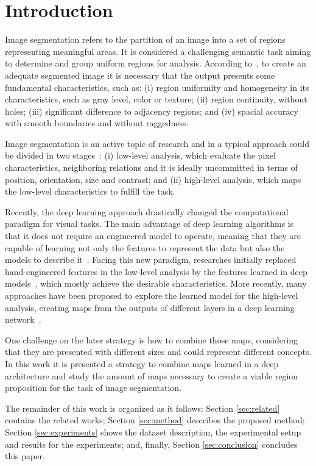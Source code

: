 \section{Introduction}
\label{sec:intro}

Image segmentation refers to the partition of an image into a set of regions representing  meaningful areas. It is considered a challenging semantic task aiming to determine and group uniform regions for analysis. According to~\cite{DOMINGUEZ}, to create an adequate segmented image it is necessary that the output presents some fundamental characteristics, such as: (i) region uniformity and homogeneity in  its characteristics, such as gray level, color or texture; (ii) region continuity, without holes; (iii) significant difference to adjacency regions; and (iv) spacial accuracy with smooth boundaries and without raggedness. 

Image segmentation is an active topic of research and in a typical approach could be divided in two stages~\cite{guigues06}: (i) low-level analysis, which evaluate the pixel characteristics, neighboring relations and it is ideally uncommitted in terms of position, orientation,
size and contrast; and (ii) high-level analysis, which maps the low-level characteristics to fulfill the task.  

Recently, the deep learning approach drastically changed the computational paradigm for visual tasks. The main advantage of deep learning algorithms is that it does not require an engineered model to operate, meaning that they are capable of learning not only the features to represent the data but also the models to describe it~\cite{goodfellow16}. Facing this new paradigm, researches initially replaced  hand-engineered features in the low-level analysis by the features learned in deep models~\cite{farabet2012,farabet2013,simonyan2014,lee2015}, which mostly achieve the desirable characteristics. More recently, many approaches have been proposed to explore the learned model for the high-level analysis, creating maps from the outputs of different layers in a deep learning network~\cite{Xie:2017:HED:3158436.3158453,cheng2016,COB:7917294,RCF:8100105}. 

One challenge on the later strategy is how to combine those maps, considering that they are presented with different sizes and could represent different concepts. In this work it is presented a strategy to combine maps learned in a deep architecture and study the amount of maps necessary to create a viable region proposition for the task of image segmentation.   

The remainder of this work is organized as it follows: Section \ref{sec:related} contains the related works; Section \ref{sec:method} describes the proposed method; Section \ref{sec:experiments} shows the dataset description, the experimental setup and results for the experiments; and, finally, Section \ref{sec:conclusion} concludes this paper.


